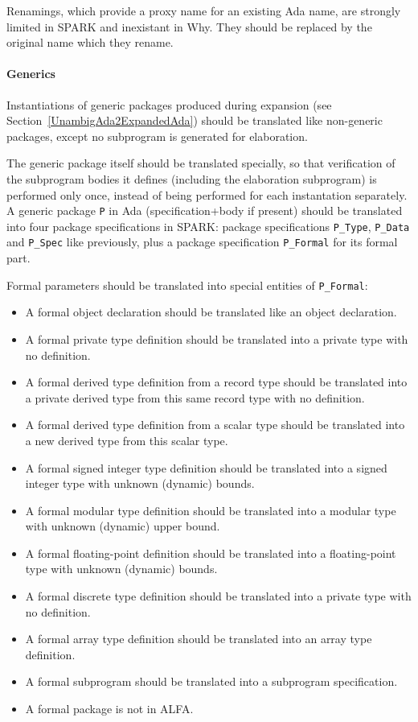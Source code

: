 \documentclass{article}
\begin{document}
Renamings, which provide a proxy name for an existing Ada name, are strongly
limited in SPARK and inexistant in Why. They should be replaced by the original
name which they rename.

\paragraph{Generics}

Instantiations of generic packages produced during expansion (see
Section~\ref{UnambigAda2ExpandedAda}) should be translated like non-generic
packages, except no subprogram is generated for elaboration.

The generic package itself should be translated specially, so that verification
of the subprogram bodies it defines (including the elaboration subprogram) is
performed only once, instead of being performed for each instantation
separately. A generic package \verb|P| in Ada (specification+body if present)
should be translated into four package specifications in SPARK: package
specifications \verb|P_Type|, \verb|P_Data| and \verb|P_Spec| like previously,
plus a package specification \verb|P_Formal| for its formal part.

Formal parameters should be translated into special entities of
\verb|P_Formal|:
\begin{itemize}
\item A formal object declaration should be translated like an object
  declaration.
\item A formal private type definition should be translated into a private type
  with no definition.
\item A formal derived type definition from a record type should be translated
  into a private derived type from this same record type with no definition.
\item A formal derived type definition from a scalar type should be translated
  into a new derived type from this scalar type.
\item A formal signed integer type definition should be translated into a
  signed integer type with unknown (dynamic) bounds.
\item A formal modular type definition should be translated into a modular type
  with unknown (dynamic) upper bound.
\item A formal floating-point definition should be translated into a
  floating-point type with unknown (dynamic) bounds.
\item A formal discrete type definition should be translated into a private
  type with no definition.
\item A formal array type definition should be translated into an array type
  definition.
\item A formal subprogram should be translated into a subprogram specification.
\item A formal package is not in ALFA.
\end{itemize}
\end{document}
